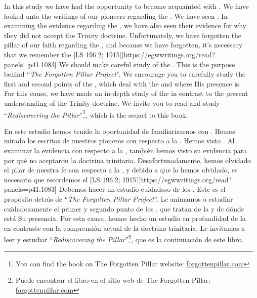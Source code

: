 In this study we have had the opportunity to become acquainted with . We have looked unto the writings of our pioneers regarding the . We have seen . In examining the evidence regarding the , we have also seen their evidence for why they did not accept the Trinity doctrine. Unfortunately, we have forgotten the pillar of our faith regarding the , and because we have forgotten, it’s necessary that we remember the [LS 196.2; 1915][https://egwwritings.org/read?panels=p41.1083] We should make careful study of the . This is the purpose behind “\textit{The Forgotten Pillar Project}”. We encourage you to carefully study the first and second points of the , which deal with the  and where His presence is. For this cause, we have made an in-depth study of the  in contrast to the present understanding of the Trinity doctrine. We invite you to read and study “\textit{Rediscovering the Pillar}”\footnote{You can find the book on The Forgotten Pillar website: \href{http://forgottenpillar.com}{forgottenpillar.com}}, which is the sequel to this book.


En este estudio hemos tenido la oportunidad de familiarizarnos con . Hemos mirado los escritos de nuestros pioneros con respecto a la . Hemos visto . Al examinar la evidencia con respecto a la , también hemos visto su evidencia para por qué no aceptaron la doctrina trinitaria. Desafortunadamente, hemos olvidado el pilar de nuestra fe con respecto a la , y debido a que lo hemos olvidado, es necesario que recordemos el [LS 196.2; 1915][https://egwwritings.org/read?panels=p41.1083] Debemos hacer un estudio cuidadoso de los . Este es el propósito detrás de “\textit{The Forgotten Pillar Project}”. Le animamos a estudiar cuidadosamente el primer y segundo punto de los , que tratan de la  y de dónde está Su presencia. Por esta causa, hemos hecho un estudio en profundidad de la  en contraste con la comprensión actual de la doctrina trinitaria. Le invitamos a leer y estudiar “\textit{Rediscovering the Pillar}”\footnote{Puede encontrar el libro en el sitio web de The Forgotten Pillar: \href{http://forgottenpillar.com}{forgottenpillar.com}}, que es la continuación de este libro.





% 
